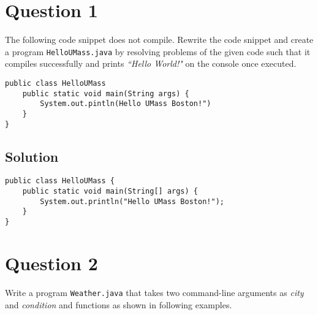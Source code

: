 %
%
%
%

\section*{Question 1}
The following code snippet does not compile. Rewrite the code snippet and create a program \texttt{HelloUMass.java} by resolving problems of the given code such that it compiles successfully and prints \textit{``Hello World!"} on the console once executed.

\lstset{language=Java}
\begin{lstlisting}
public class HelloUMass
	public static void main(String args) {
		System.out.pintln(Hello UMass Boston!")
	}
}
\end{lstlisting}

\subsection*{Solution}
\lstset{language=Java,tabsize=2}
\begin{lstlisting}
public class HelloUMass {
	public static void main(String[] args) {
		System.out.println("Hello UMass Boston!");
	}
}
\end{lstlisting}

\section*{Question 2}
Write a program \texttt{Weather.java} that takes two command-line arguments as \textit{city} and \textit{condition} and functions as shown in following examples.

